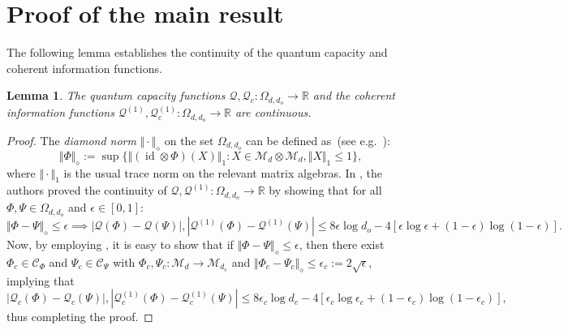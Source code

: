 \documentclass[a4paper,onecolumn,10pt,accepted=2022-07-11]{quantumarticle}
\newcommand{\M}[1]{\mathcal{M}_{#1}}
\newtheorem{lemma}[theorem]{Lemma}
\theoremstyle{definition}
\begin{document}
\section{Proof of the main result}\label{appen:main}
The following lemma establishes the continuity of the quantum capacity and coherent information functions. 
\begin{lemma}
The quantum capacity functions $\mathcal{Q},\mathcal{Q}_c:\Omega_{d,d_o}\to\mathbb{R}$ and the coherent information functions $\mathcal{Q}^{(1)},\mathcal{Q}^{(1)}_c:\Omega_{d,d_o}\to\mathbb{R}$ are continuous.
\end{lemma}
\begin{proof}
The \emph{diamond norm} $\Vert \cdot \Vert_\diamond$ on the set $\Omega_{d,d_o}$ can be defined as~(see e.g.~\cite[Chapter 9]{Wilde2009book}):
\begin{equation*}
    \Vert \Phi \Vert_{\diamond} := \sup \{ \Vert(\operatorname{id} \otimes \Phi)(X)\Vert_1 : X\in \M{d}\otimes \M{d}, \Vert X\Vert_1 \leq 1\},
\end{equation*}
where $\Vert \cdot \Vert_1$ is the usual trace norm on the relevant matrix algebras. In \cite{Leung2009continuity}, the authors proved the continuity of $\mathcal{Q},\mathcal{Q}^{(1)}:\Omega_{d,d_o}\to\mathbb{R}$ by showing that for all $\Phi,\Psi\in\Omega_{d,d_o}$ and $\epsilon\in [0,1]$:
\begin{equation*} 
    \Vert \Phi - \Psi \Vert_\diamond \leq \epsilon \implies |\mathcal{Q}(\Phi)-\mathcal{Q}(\Psi)|,|\mathcal{Q}^{(1)}(\Phi)-\mathcal{Q}^{(1)}(\Psi)|\leq 8\epsilon\log d_o - 4[\epsilon\log\epsilon + (1-\epsilon)\log(1-\epsilon)].
\end{equation*}
Now, by employing \cite[Theorem 1]{Werner2008continuity}, it is easy to show that if $\Vert \Phi - \Psi \Vert_\diamond \leq \epsilon$, then there exist $\Phi_c\in\mathcal{C}_\Phi$ and $\Psi_c\in\mathcal{C}_\Psi$ with $\Phi_c,\Psi_c:\M{d}\to \M{d_e}$ and $\Vert \Phi_c - \Psi_c\Vert_\diamond \leq \epsilon_c:=2\sqrt{\epsilon}$, implying that
\begin{equation*}
|\mathcal{Q}_c(\Phi)-\mathcal{Q}_c(\Psi)|,|\mathcal{Q}^{(1)}_c(\Phi)-\mathcal{Q}^{(1)}_c(\Psi)|\leq 8\epsilon_c\log d_e - 4[\epsilon_c\log\epsilon_c + (1-\epsilon_c)\log(1-\epsilon_c)],
\end{equation*}
thus completing the proof.
\end{proof}
\end{document}
